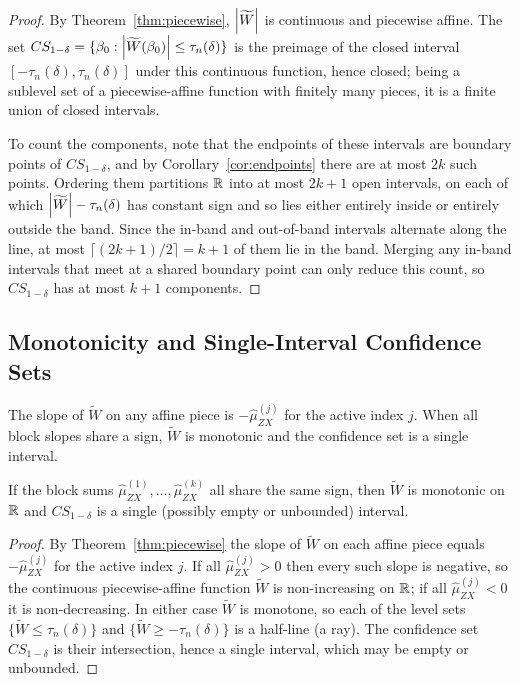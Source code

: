 \begin{proof}
By Theorem~\ref{thm:piecewise}, $\left|\widetilde{W}\right|$ is continuous and piecewise affine. The set $CS_{1-\delta}=\{\beta_0:\left|\widetilde{W}(\beta_0)\right|\le\tau_n(\delta)\}$ is the preimage of the closed interval $[-\tau_n(\delta),\tau_n(\delta)]$ under this continuous function, hence closed; being a sublevel set of a piecewise-affine function with finitely many pieces, it is a finite union of closed intervals.

To count the components, note that the endpoints of these intervals are boundary points of $CS_{1-\delta}$, and by Corollary~\ref{cor:endpoints} there are at most $2k$ such points. Ordering them partitions $\mathbb{R}$ into at most $2k+1$ open intervals, on each of which $\left|\widetilde{W}\right|-\tau_n(\delta)$ has constant sign and so lies either entirely inside or entirely outside the band. Since the in-band and out-of-band intervals alternate along the line, at most $\lceil (2k+1)/2\rceil = k+1$ of them lie in the band. Merging any in-band intervals that meet at a shared boundary point can only reduce this count, so $CS_{1-\delta}$ has at most $k+1$ components.
\end{proof}

\subsection{Monotonicity and Single-Interval Confidence Sets}
\label{sec:monotonicity}

The slope of $\widetilde{W}$ on any affine piece is $-\hat{\mu}_{ZX}^{(j)}$ for the active index $j$. When all block slopes share a sign, $\widetilde{W}$ is monotonic and the confidence set is a single interval.

\begin{proposition}
\label{prop:mono_det}
If the block sums $\hat{\mu}_{ZX}^{(1)},\dots,\hat{\mu}_{ZX}^{(k)}$ all share the same sign, then $\widetilde{W}$ is monotonic on $\mathbb{R}$ and $CS_{1-\delta}$ is a single (possibly empty or unbounded) interval.
\end{proposition}

\begin{proof}
By Theorem~\ref{thm:piecewise} the slope of $\widetilde{W}$ on each affine piece equals $-\hat{\mu}_{ZX}^{(j)}$ for the active index $j$. If all $\hat{\mu}_{ZX}^{(j)}>0$ then every such slope is negative, so the continuous piecewise-affine function $\widetilde{W}$ is non-increasing on $\mathbb{R}$; if all $\hat{\mu}_{ZX}^{(j)}<0$ it is non-decreasing. In either case $\widetilde{W}$ is monotone, so each of the level sets $\{\widetilde{W}\le\tau_n(\delta)\}$ and $\{\widetilde{W}\ge-\tau_n(\delta)\}$ is a half-line (a ray). The confidence set $CS_{1-\delta}$ is their intersection, hence a single interval, which may be empty or unbounded.
\end{proof}

